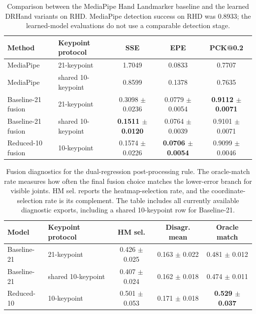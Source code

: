 \documentclass[10pt,letterpaper]{article}
\begin{document}
\begin{table}[H]
\centering
\footnotesize
\caption{Comparison between the MediaPipe Hand Landmarker baseline and the learned DRHand variants on RHD. MediaPipe detection success on RHD was 0.8933; the learned-model evaluations do not use a comparable detection stage.}
\label{tab:mediapipe_baseline}
\begin{tabular}{llccc}
\toprule
Method & Keypoint protocol & SSE & EPE & PCK@0.2 \\
\midrule
MediaPipe & 21-keypoint & 1.7049 & 0.0833 & 0.7707 \\
MediaPipe & shared 10-keypoint & 0.8599 & 0.1378 & 0.7635 \\
Baseline-21 fusion & 21-keypoint & 0.3098 $\pm$ 0.0236 & 0.0779 $\pm$ 0.0054 & \textbf{0.9112 $\pm$ 0.0071} \\
Baseline-21 fusion & shared 10-keypoint & \textbf{0.1511 $\pm$ 0.0120} & 0.0764 $\pm$ 0.0039 & 0.9101 $\pm$ 0.0071 \\
Reduced-10 fusion & 10-keypoint & 0.1574 $\pm$ 0.0226 & \textbf{0.0706 $\pm$ 0.0054} & 0.9099 $\pm$ 0.0046 \\
\bottomrule
\end{tabular}
\end{table}

\begin{table}[H]
\centering
\footnotesize
\caption{Fusion diagnostics for the dual-regression post-processing rule. The oracle-match rate measures how often the final fusion choice matches the lower-error branch for visible joints. HM sel. reports the heatmap-selection rate, and the coordinate-selection rate is its complement. The table includes all currently available diagnostic exports, including a shared 10-keypoint row for Baseline-21.}
\label{tab:fusion_diagnostics}
\begin{tabular}{llccc}
\toprule
Model & Keypoint protocol & HM sel. & Disagr. mean & Oracle match \\
\midrule
Baseline-21 & 21-keypoint & 0.426 $\pm$ 0.025 & 0.163 $\pm$ 0.022 & 0.481 $\pm$ 0.012 \\
Baseline-21 & shared 10-keypoint & 0.407 $\pm$ 0.024 & 0.162 $\pm$ 0.018 & 0.474 $\pm$ 0.011 \\
Reduced-10 & 10-keypoint & 0.501 $\pm$ 0.053 & 0.171 $\pm$ 0.018 & \textbf{0.529 $\pm$ 0.037} \\
\bottomrule
\end{tabular}
\end{table}
\end{document}
